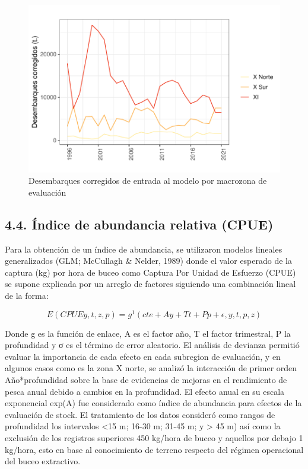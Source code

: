 \documentclass[
]{article}
\begin{document}
\begin{figure}

{\centering \includegraphics{Figuras/DesembZo-1} 

}

\caption{Desembarques corregidos de entrada al modelo por macrozona de evaluación}\label{fig:DesembZo}
\end{figure}

\hypertarget{uxedndice-de-abundancia-relativa-cpue}{%
\subsection{4.4. Índice de abundancia relativa
(CPUE)}\label{uxedndice-de-abundancia-relativa-cpue}}

Para la obtención de un índice de abundancia, se utilizaron modelos
lineales generalizados (GLM; McCullagh \& Nelder, 1989) donde el valor
esperado de la captura (kg) por hora de buceo como Captura Por Unidad de
Esfuerzo (CPUE) se supone explicada por un arreglo de factores siguiendo
una combinación lineal de la forma:

\[E(CPUE y, t, z, p) =  g^{1} (cte + Ay + Tt + Pp + \epsilon,  y , t, p,  z)\]

Donde g es la función de enlace, A es el factor año, T el factor
trimestral, P la profundidad y σ es el término de error aleatorio. El
análisis de devianza permitió evaluar la importancia de cada efecto en
cada subregion de evaluación, y en algunos casos como es la zona X
norte, se analizó la interacción de primer orden Año*profundidad sobre
la base de evidencias de mejoras en el rendimiento de pesca anual debido
a cambios en la profundidad. El efecto anual en su escala exponencial
exp(A) fue considerado como índice de abundancia para efectos de la
evaluación de stock. El tratamiento de los datos consideró como rangos
de profundidad los intervalos \textless15 m; 16-30 m; 31-45 m; y
\textgreater{} 45 m) así como la exclusión de los registros superiores
450 kg/hora de buceo y aquellos por debajo 1 kg/hora, esto en base al
conocimiento de terreno respecto del régimen operacional del buceo
extractivo.
\end{document}
